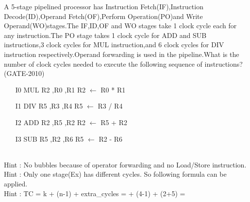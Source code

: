 \begin{questyle}
  \question  A 5-stage pipelined processor has Instruction Fetch(IF),Instruction Decode(ID),Operand
             Fetch(OF),Perform Operation(PO)and Write Operand(WO)stages.The IF,ID,OF and WO stages
             take 1 clock cycle each for any instruction.The PO stage takes 1 clock cycle for ADD
             and SUB instructions,3 clock cycles for MUL instruction,and 6 clock cycles for DIV
             instruction respectively.Operand forwarding is used in the pipeline.What is the number
             of clock cycles needed to execute the following sequence of instructions?  (GATE-2010)

  \begin{enumerate}
    \item[I0] \quad MUL R2 ,R0 ,R1 \qquad R2 \(\leftarrow\) R0 * R1
    \item[I1] \quad DIV R5 ,R3 ,R4  \qquad R5 \(\leftarrow\) R3 / R4
    \item[I2] \quad ADD R2 ,R5 ,R2 \qquad R2 \(\leftarrow\) R5 + R2
    \item[I3] \quad SUB R5 ,R2 ,R6 \qquad R5 \(\leftarrow\) R2 - R6
  \end{enumerate}

  \begin{oneparchoices}
  \end{oneparchoices} \\
  Hint : No bubbles because of operator forwarding and no Load/Store instruction. \\
  Hint : Only one stage(Ex) has different cycles. So following formula can be applied.\\
  Hint : TC = \; k + (n-1) + extra\_cycles =  + (4-1) + (2+5) = 
\end{questyle}

